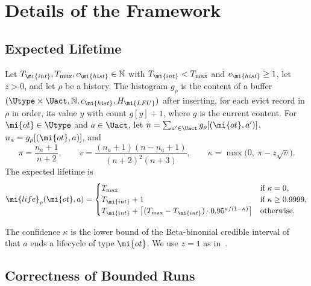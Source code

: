 
\section{Details of the Framework}
\label{app:framework}

\subsection{Expected Lifetime}

\begin{definition}
\label{def:life}
Let $T_{\mi{int}}, T_{\max}, c_{\mi{hist}} \in \mathbb{N}$ with
$T_{\mi{int}} < T_{\max}$ and $c_{\mi{hist}} \ge 1$, let $z > 0$, and let
$\rho$ be a history.
The histogram $g_\rho$ is the content of a buffer
$(\Utype \times \Uact, \mathbb{N}, c_{\mi{hist}}, H_{\mi{LFU}})$ after
inserting, for each evict record in $\rho$ in order, its value $y$ with count
$g[y] + 1$, where $g$ is the current content.
For $\mi{ot} \in \Utype$ and $a \in \Uact$, let
$n = \sum_{a' \in \Uact} g_\rho[(\mi{ot}, a')]$,
$n_a = g_\rho[(\mi{ot}, a)]$, and
\[
  \pi = \frac{n_a + 1}{n + 2}, \qquad
  v = \frac{(n_a + 1)(n - n_a + 1)}{(n + 2)^2 (n + 3)}, \qquad
  \kappa = \max\bigl(0,\ \pi - z \sqrt{v}\bigr).
\]
The expected lifetime is
\[
  \mi{life}_\rho(\mi{ot}, a) =
  \begin{cases}
    T_{\max} & \text{if } \kappa = 0,\\
    T_{\mi{int}} + 1 & \text{if } \kappa \ge 0.9999,\\
    T_{\mi{int}} + \bigl\lceil (T_{\max} - T_{\mi{int}}) \cdot
      0.95^{\kappa / (1 - \kappa)} \bigr\rceil & \text{otherwise.}
  \end{cases}
\]
\end{definition}

The confidence $\kappa$ is the lower bound of the Beta-binomial credible
interval of~\cite{Muehlmeyer2026} that $a$ ends a lifecycle of type
$\mi{ot}$.
We use $z = 1$ as in~\cite{Muehlmeyer2026}.

\subsection{Correctness of Bounded Runs}

